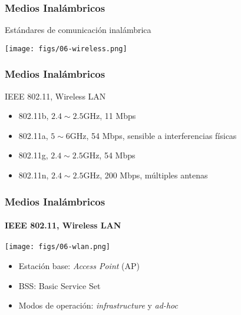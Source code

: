 \documentclass[letter]{beamer}
\begin{document}
\begin{frame}
  \frametitle{Medios Inalámbricos}

  Estándares de comunicación inalámbrica
  
  \begin{center}
    \texttt{[image: figs/06-wireless.png]}
  \end{center}
  

\end{frame}

\begin{frame}
  \frametitle{Medios Inalámbricos}

  IEEE 802.11, Wireless LAN
  
  \begin{itemize}
    \item 802.11b, $2.4\sim 2.5$GHz, 11 Mbps
    \item 802.11a, $5 \sim 6$GHz, 54 Mbps, sensible a interferencias físicas
    \item 802.11g, $2.4\sim 2.5$GHz, 54 Mbps
    \item 802.11n, $2.4\sim 2.5$GHz, 200 Mbps, múltiples antenas
  \end{itemize}

\end{frame}
\begin{frame}
  \frametitle{Medios Inalámbricos}
  \framesubtitle{IEEE 802.11, Wireless LAN}

  \begin{center}
    \texttt{[image: figs/06-wlan.png]}
  \end{center}

  \begin{itemize}
    \item Estación base: {\em Access Point} (AP)
    \item BSS: Basic Service Set
    \item Modos de operación: {\em infrastructure} y {\em ad-hoc}
  \end{itemize}
  
\end{frame}
\end{document}
